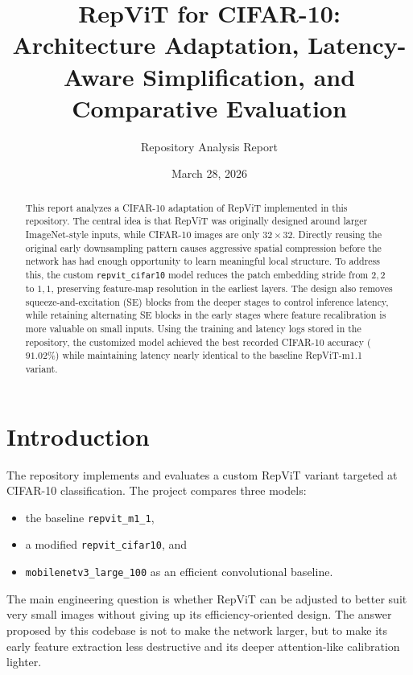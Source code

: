 \documentclass[11pt,a4paper]{article}
\title{\textbf{RepViT for CIFAR-10:}\\Architecture Adaptation, Latency-Aware Simplification, and Comparative Evaluation}
\author{Repository Analysis Report}
\date{March 28, 2026}
\begin{document}
\maketitle

\begin{abstract}
This report analyzes a CIFAR-10 adaptation of RepViT implemented in this repository. The central idea is that RepViT was originally designed around larger ImageNet-style inputs, while CIFAR-10 images are only \(32 \times 32\). Directly reusing the original early downsampling pattern causes aggressive spatial compression before the network has had enough opportunity to learn meaningful local structure. To address this, the custom \texttt{repvit\_cifar10} model reduces the patch embedding stride from \(2,2\) to \(1,1\), preserving feature-map resolution in the earliest layers. The design also removes squeeze-and-excitation (SE) blocks from the deeper stages to control inference latency, while retaining alternating SE blocks in the early stages where feature recalibration is more valuable on small inputs. Using the training and latency logs stored in the repository, the customized model achieved the best recorded CIFAR-10 accuracy (\(91.02\%\)) while maintaining latency nearly identical to the baseline RepViT-m1.1 variant.
\end{abstract}

\section{Introduction}

The repository implements and evaluates a custom RepViT variant targeted at CIFAR-10 classification. The project compares three models:
\begin{itemize}[leftmargin=1.5em]
    \item the baseline \texttt{repvit\_m1\_1},
    \item a modified \texttt{repvit\_cifar10}, and
    \item \texttt{mobilenetv3\_large\_100} as an efficient convolutional baseline.
\end{itemize}

The main engineering question is whether RepViT can be adjusted to better suit very small images without giving up its efficiency-oriented design. The answer proposed by this codebase is not to make the network larger, but to make its early feature extraction less destructive and its deeper attention-like calibration lighter.
\end{document}
